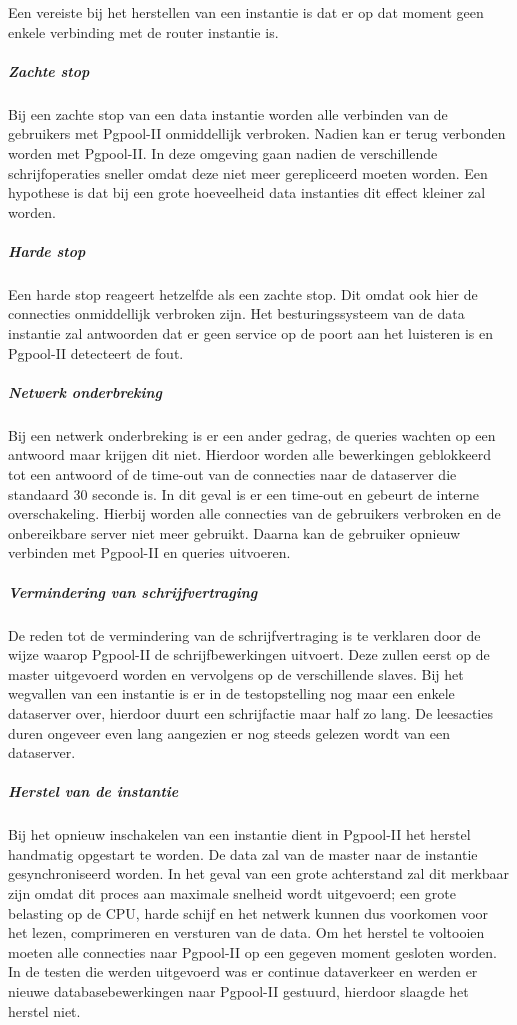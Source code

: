 Een vereiste bij het herstellen van een instantie is dat er op dat moment geen enkele verbinding met de router instantie is. 

\subparagraph{Zachte stop} Bij een zachte stop van een data instantie worden alle verbinden van de gebruikers met Pgpool-II onmiddellijk verbroken. Nadien kan er terug verbonden worden met Pgpool-II. In deze omgeving gaan nadien de verschillende schrijfoperaties sneller omdat deze niet meer gerepliceerd moeten worden. Een hypothese is dat bij een grote hoeveelheid data instanties dit effect kleiner zal worden.  

\subparagraph{Harde stop} Een harde stop reageert hetzelfde als een zachte stop. Dit omdat ook hier de connecties onmiddellijk verbroken zijn. Het besturingssysteem van de data instantie zal antwoorden dat er geen service op de poort aan het luisteren is en Pgpool-II detecteert de fout. 

\subparagraph{Netwerk onderbreking} Bij een netwerk onderbreking is er een ander gedrag, de queries wachten op een antwoord maar krijgen dit niet. Hierdoor worden alle bewerkingen geblokkeerd tot een antwoord of de time-out van de connecties naar de dataserver die standaard 30 seconde is. In dit geval is er een time-out en gebeurt de interne overschakeling. Hierbij worden alle connecties van de gebruikers verbroken en de onbereikbare server niet meer gebruikt. Daarna kan de gebruiker opnieuw verbinden met Pgpool-II en queries uitvoeren. 

\subparagraph{Vermindering van schrijfvertraging} De reden tot de vermindering van de schrijfvertraging is te verklaren door de wijze waarop Pgpool-II de schrijfbewerkingen uitvoert. Deze zullen eerst op de master uitgevoerd worden en vervolgens op de verschillende slaves. Bij het wegvallen van een instantie is er in de testopstelling nog maar een enkele dataserver over, hierdoor duurt een schrijfactie maar half zo lang. De leesacties duren ongeveer even lang aangezien er nog steeds gelezen wordt van een dataserver. 

\subparagraph{Herstel van de instantie} Bij het opnieuw inschakelen van een instantie dient in Pgpool-II het herstel handmatig opgestart te worden. De data zal van de master naar de instantie gesynchroniseerd worden. In het geval van een grote achterstand zal dit merkbaar zijn omdat dit proces aan maximale snelheid wordt uitgevoerd; een grote belasting op de CPU, harde schijf en het netwerk kunnen dus voorkomen voor het lezen, comprimeren en versturen van de data. Om het herstel te voltooien moeten alle connecties naar Pgpool-II op een gegeven moment gesloten worden. In de testen die werden uitgevoerd was er continue dataverkeer en werden er nieuwe databasebewerkingen naar Pgpool-II gestuurd, hierdoor slaagde het herstel niet. 

